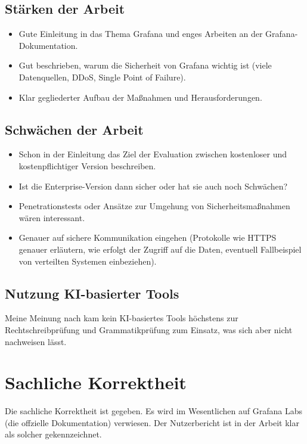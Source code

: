 \documentclass[a4paper,DIV=16]{scrartcl}
\begin{document}
\subsection*{Stärken der Arbeit}

\begin{itemize}
  \item Gute Einleitung in das Thema Grafana und enges Arbeiten an der
  Grafana-Dokumentation.
  \item Gut beschrieben, warum die Sicherheit von Grafana wichtig ist (viele
  Datenquellen, DDoS, Single Point of Failure).
  \item Klar gegliederter Aufbau der Maßnahmen und Herausforderungen.
\end{itemize}


\subsection*{Schwächen der Arbeit}

\begin{itemize}
  \item Schon in der Einleitung das Ziel der Evaluation zwischen kostenloser und
  kostenpflichtiger Version beschreiben.
  \item Ist die Enterprise-Version dann sicher oder hat sie auch noch Schwächen?
  \item Penetrationstests oder Ansätze zur Umgehung von Sicherheitsmaßnahmen
  wären interessant.
  \item Genauer auf sichere Kommunikation eingehen (Protokolle wie HTTPS genauer
  erläutern, wie erfolgt der Zugriff auf die Daten, eventuell Fallbeispiel von
  verteilten Systemen einbeziehen).
\end{itemize}


\subsection*{Nutzung KI-basierter Tools}
Meine Meinung nach kam kein KI-basiertes Tools höchstens zur Rechtschreibprüfung und
Grammatikprüfung zum Einsatz, was sich aber nicht nachweisen lässt.
  

\section*{Sachliche Korrektheit}
  Die sachliche Korrektheit ist gegeben. Es wird im Wesentlichen auf Grafana
  Labs (die offzielle Dokumentation) verwiesen. Der Nutzerbericht ist in der
  Arbeit klar als solcher gekennzeichnet.
\end{document}
